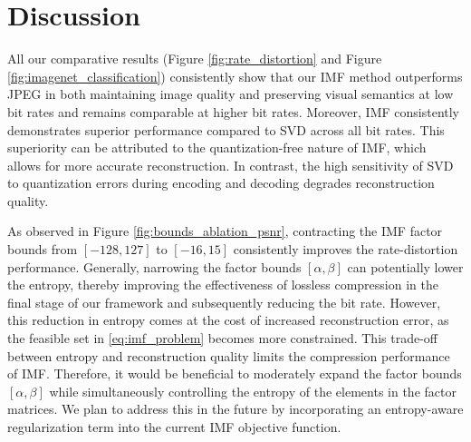 \section{Discussion} \label{sec:discussion}

All our comparative results (Figure \ref{fig:rate_distortion} and Figure \ref{fig:imagenet_classification}) consistently show that our IMF method outperforms JPEG in both maintaining image quality and preserving visual semantics at low bit rates and remains comparable at higher bit rates. Moreover, IMF consistently demonstrates superior performance compared to SVD across all bit rates. This superiority can be attributed to the quantization-free nature of IMF, which allows for more accurate reconstruction. In contrast, the high sensitivity of SVD to quantization errors during encoding and decoding degrades reconstruction quality.


As observed in Figure \ref{fig:bounds_ablation_psnr}, contracting the IMF factor bounds from $[-128, 127]$ to $[-16, 15]$ consistently improves the rate-distortion performance. Generally, narrowing the factor bounds $[\alpha, \beta]$ can potentially lower the entropy, thereby improving the effectiveness of lossless compression in the final stage of our framework and subsequently reducing the bit rate. However, this reduction in entropy comes at the cost of increased reconstruction error, as the feasible set in \eqref{eq:imf_problem} becomes more constrained. This trade-off between entropy and reconstruction quality limits the compression performance of IMF. Therefore, it would be beneficial to moderately expand the factor bounds $[\alpha, \beta]$ while simultaneously controlling the entropy of the elements in the factor matrices. We plan to address this in the future by incorporating an entropy-aware regularization term into the current IMF objective function.

